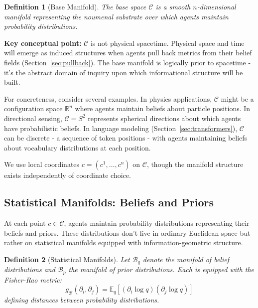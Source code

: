 \documentclass[11pt]{article}
\newtheorem{definition}{Definition}
\begin{document}
\begin{definition}[Base Manifold]
The base space $\mathcal{C}$ is a smooth $n$-dimensional manifold representing the noumenal substrate over which agents maintain probability distributions.
\end{definition}

\textbf{Key conceptual point:} $\mathcal{C}$ is not physical spacetime. Physical space and time will emerge as induced structures when agents pull back metrics from their belief fields (Section~\ref{sec:pullback}). The base manifold is logically prior to spacetime - it's the abstract domain of inquiry upon which informational structure will be built.

For concreteness, consider several examples. In physics applications, $\mathcal{C}$ might be a configuration space $\mathbb{R}^n$ where agents maintain beliefs about particle positions. In directional sensing, $\mathcal{C} = S^2$ represents spherical directions about which agents have probabilistic beliefs. In language modeling (Section~\ref{sec:transformers}), $\mathcal{C}$ can be discrete - a sequence of token positions - with agents maintaining beliefs about vocabulary distributions at each position.

We use local coordinates $c = (c^1, \ldots, c^n)$ on $\mathcal{C}$, though the manifold structure exists independently of coordinate choice.

\subsection{Statistical Manifolds: Beliefs and Priors}

At each point $c \in \mathcal{C}$, agents maintain probability distributions representing their beliefs and priors. These distributions don't live in ordinary Euclidean space but rather on statistical manifolds equipped with information-geometric structure.

\begin{definition}[Statistical Manifolds]
Let $\mathcal{B}_q$ denote the manifold of belief distributions and $\mathcal{B}_p$ the manifold of prior distributions. Each is equipped with the Fisher-Rao metric:
\begin{equation}
g_{\mathcal{B}}(\partial_i, \partial_j) = \mathbb{E}_{q}\left[(\partial_i \log q)(\partial_j \log q)\right]
\end{equation}
defining distances between probability distributions.
\end{definition}
\end{document}
